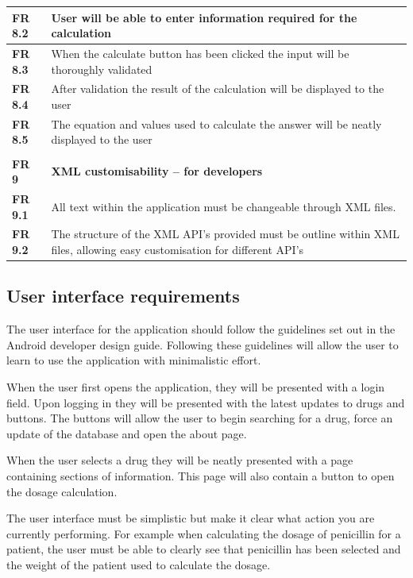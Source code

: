 \documentclass[11pt,fleqn,twoside]{article}
\begin{document}
\begin{center}
\begin{longtable}{| l | p{14.3cm} |}
\textbf{FR 8.2} & User will be able to enter information required for the calculation    \\ \hline
\textbf{FR 8.3} & When the calculate button has been clicked the input will be thoroughly validated\\ \hline
\textbf{FR 8.4} & After validation the result of the calculation will be displayed to the user\\ \hline
\textbf{FR 8.5} & The equation and values used to calculate the answer will be neatly displayed to the user  \\ \hline
\textbf{}  &  \\ \hline
\textbf{FR 9}   & \textbf{XML customisability – for developers} \\ \hline
\textbf{FR 9.1} & All text within the application must be changeable through XML files.  \\ \hline
\textbf{FR 9.2} & The structure of the XML API’s provided must be outline within XML files, allowing easy customisation for different API’s   \\ \hline
\end{longtable}
\end{center}


\subsection{User interface requirements}
The user interface for the application should follow the guidelines set out in the Android developer design guide. Following these guidelines will allow the user to learn to use the application with minimalistic effort.

When the user first opens the application, they will be presented with a login field. Upon logging in they will be presented with the latest updates to drugs and buttons. The buttons will allow the user to begin searching for a drug, force an update of the database and open the about page.

When the user selects a drug they will be neatly presented with a page containing sections of information. This page will also contain a button to open the dosage calculation.

The user interface must be simplistic but make it clear what action you are currently performing. For example when calculating the dosage of penicillin for a patient, the user must be able to clearly see that penicillin has been selected and the weight of the patient used to calculate the dosage.
\end{document}
